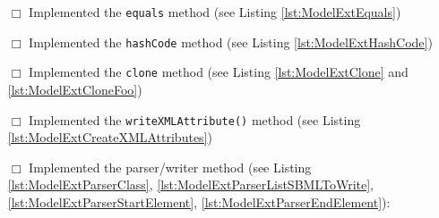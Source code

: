 \begin{itemize}
        \item [$\Box$] Implemented the \texttt{equals} method (see Listing \ref{lst:ModelExtEquals})
        \item [$\Box$] Implemented the \texttt{hashCode} method (see Listing \ref{lst:ModelExtHashCode})
        \item [$\Box$] Implemented the \texttt{clone} method (see Listing \ref{lst:ModelExtClone} and \ref{lst:ModelExtCloneFoo})
        \item [$\Box$] Implemented the \texttt{writeXMLAttribute()} method (see Listing \ref{lst:ModelExtCreateXMLAttributes})
        \item [$\Box$] Implemented the parser/writer method (see Listing \ref{lst:ModelExtParserClass}, \ref{lst:ModelExtParserListSBMLToWrite}, \ref{lst:ModelExtParserStartElement}, \ref{lst:ModelExtParserEndElement}):
   \end{itemize}
